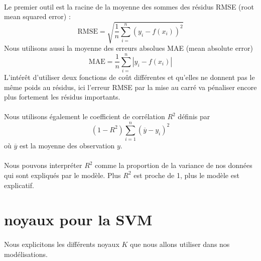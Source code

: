 \documentclass[a4paper,12pt,titlepage]{report}
\begin{document}
\paragraph{}
Le premier outil est la racine de la moyenne des sommes des résidus
RMSE (root mean squared error) : 
\[
\text{RMSE} = \sqrt{\frac{1}{n}\sum_{i=}^n {(y_i - f(x_i))^2}}
\] 
Nous utilisons aussi la moyenne des erreurs absolues MAE (mean absolute error)
\[
\text{MAE} = \frac{1}{n}\sum_{i=}^n {|y_i - f(x_i)|}
\] 
L'intérêt d'utiliser deux fonctions de coût différentes et qu'elles ne donnent pas le même poids au résidus, ici l'erreur RMSE par la mise au carré va pénaliser encore plus fortement les résidus importants.

\paragraph{}
Nous utilisons également le coefficient de corrélation $R^2$
définis par 
\[ (1 - R^2) \sum_{i=1}^n {(\overline{y} - y_i)^2} \]
où $\overline{y}$ est la moyenne des observation $y$.

\paragraph{}
Nous pouvons interpréter $R^2$ comme la proportion de la variance de nos données qui sont expliqués par le modèle. Plus $R^2$ est proche de 1, plus le modèle est explicatif.






\section{noyaux pour la SVM}
\paragraph{}
Nous explicitons les différents noyaux $K$ que nous allons utiliser dans nos modélisations.\\
\end{document}
